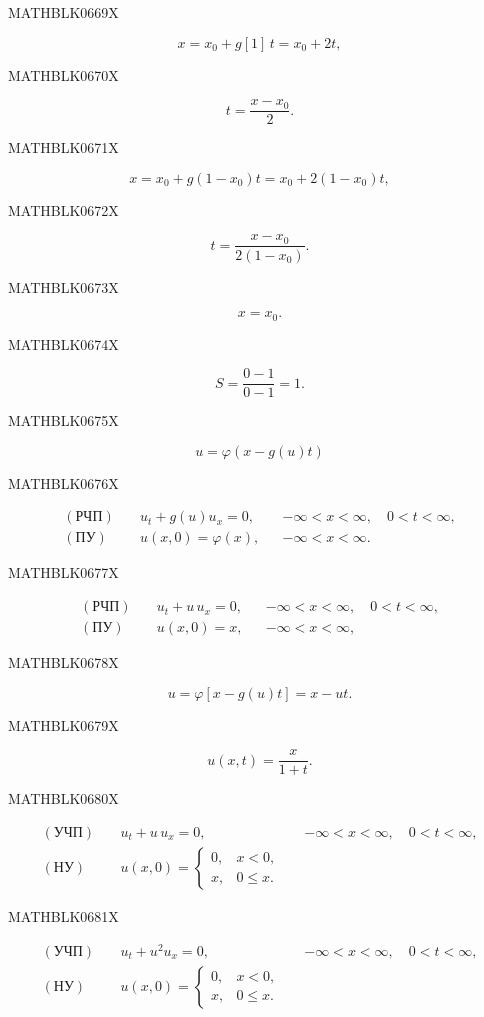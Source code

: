 \documentclass[
  ukrainian,
]{article}
\begin{document}
MATHBLK0669X

\[
x = x_0 + g[1]\,t = x_0 + 2t,
\]

MATHBLK0670X

\[
t = \frac{x-x_0}{2}.
\]

MATHBLK0671X

\[
x = x_0 + g(1-x_0)t = x_0 + 2(1-x_0)t,
\]

MATHBLK0672X

\[
t = \frac{x-x_0}{2(1-x_0)}.
\]

MATHBLK0673X

\[
x = x_0.
\]

MATHBLK0674X

\[
S=\frac{0-1}{0-1}=1.
\]

MATHBLK0675X

\[
u=\varphi(x-g(u)t)
\]

MATHBLK0676X

\[
\begin{aligned}
(\text{РЧП})\quad & u_t + g(u)u_x = 0, && -\infty < x < \infty,\quad 0 < t < \infty,\\
(\text{ПУ})\quad & u(x,0)=\varphi(x), && -\infty < x < \infty.
\end{aligned}
\]

MATHBLK0677X

\[
\begin{aligned}
(\text{РЧП})\quad & u_t + u\,u_x = 0, && -\infty < x < \infty,\quad 0 < t < \infty,\\
(\text{ПУ})\quad & u(x,0)=x, && -\infty < x < \infty,
\end{aligned}
\]

MATHBLK0678X

\[
u=\varphi[x-g(u)t]=x-ut.
\]

MATHBLK0679X

\[
u(x,t)=\frac{x}{1+t}.
\]

MATHBLK0680X

\[
\begin{aligned}
(\text{УЧП})\quad & u_t + u\,u_x = 0, && -\infty < x < \infty,\quad 0 < t < \infty, \\
(\text{НУ})\quad &
u(x,0)=
\begin{cases}
0, & x < 0,\\
x, & 0 \le x.
\end{cases}
\end{aligned}
\]

MATHBLK0681X

\[
\begin{aligned}
(\text{УЧП})\quad & u_t + u^2 u_x = 0, && -\infty < x < \infty,\quad 0 < t < \infty, \\
(\text{НУ})\quad &
u(x,0)=
\begin{cases}
0, & x < 0,\\
x, & 0 \le x.
\end{cases}
\end{aligned}
\]
\end{document}

